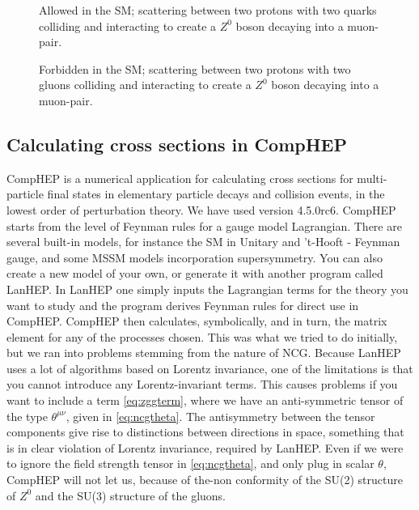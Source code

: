\begin{figure}[htp]
	\centering
	\begin{minipage}[b]{0.475\linewidth} 
    \centering
	  
	  \caption{Allowed in the SM; scattering between two protons with two quarks colliding and interacting to create a $Z^0$ boson decaying into a muon-pair.} \label{fig:feyn:parton_qq}
	\end{minipage}
	\hspace{0.5cm}
	\begin{minipage}[b]{0.475\linewidth} 
    \centering
	  
	  \caption{Forbidden in the SM; scattering between two protons with two gluons colliding and interacting to create a $Z^0$ boson decaying into a muon-pair.} \label{fig:feyn:parton_gg}%
	\end{minipage}
\end{figure}

\subsection{Calculating cross sections in CompHEP}
CompHEP is a numerical application for calculating cross sections for multi-particle final states in elementary particle decays and collision events, in the lowest order of perturbation theory. We have used version 4.5.0rc6. CompHEP starts from the level of Feynman rules for a gauge model Lagrangian. There are several built-in models, for instance the SM in Unitary and 't-Hooft - Feynman gauge, and some MSSM models incorporation supersymmetry. You can also create a new model of your own, or generate it with another program called LanHEP. In LanHEP one simply inputs the Lagrangian terms for the theory you want to study and the program derives Feynman rules for direct use in CompHEP. CompHEP then calculates, symbolically, and in turn, the matrix element for any of the processes chosen. This was what we tried to do initially, but we ran into problems stemming from the nature of NCG. Because LanHEP uses a lot of algorithms based on Lorentz invariance, one of the limitations is that you cannot introduce any Lorentz-invariant terms. This causes problems if you want to include a term \eqref{eq:zggterm}, where we have an anti-symmetric tensor of the type $\theta^{\mu\nu}$, given in \eqref{eq:ncgtheta}. The antisymmetry between the tensor components give rise to distinctions between directions in space, something that is in clear violation of Lorentz invariance, required by LanHEP. Even if we were to ignore the field strength tensor in \eqref{eq:ncgtheta}, and only plug in scalar $\theta$, CompHEP will not let us, because of the-non conformity of the SU(2) structure of $Z^0$ and the SU(3) structure of the gluons. \cite{semenov}

